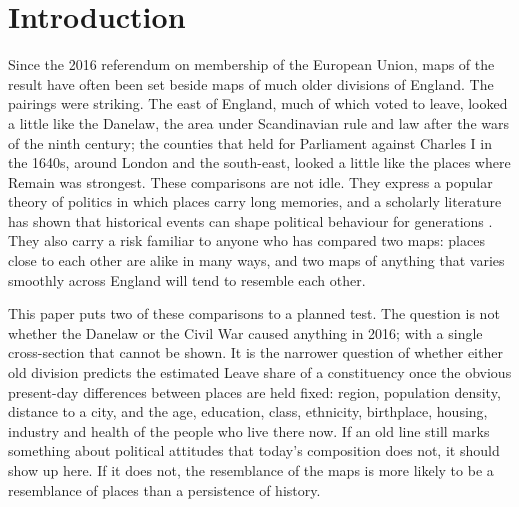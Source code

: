 \documentclass[11pt,a4paper]{article}
\begin{document}
\section{Introduction}\label{sec:intro}
Since the 2016 referendum on membership of the European Union, maps of the result have often been set beside maps of much older divisions of England. The pairings were striking. The east of England, much of which voted to leave, looked a little like the Danelaw, the area under Scandinavian rule and law after the wars of the ninth century; the counties that held for Parliament against Charles I in the 1640s, around London and the south-east, looked a little like the places where Remain was strongest. These comparisons are not idle. They express a popular theory of politics in which places carry long memories, and a scholarly literature has shown that historical events can shape political behaviour for generations \citep{satyanath2017,rodden2019}. They also carry a risk familiar to anyone who has compared two maps: places close to each other are alike in many ways, and two maps of anything that varies smoothly across England will tend to resemble each other.

This paper puts two of these comparisons to a planned test. The question is not whether the Danelaw or the Civil War caused anything in 2016; with a single cross-section that cannot be shown. It is the narrower question of whether either old division predicts the estimated Leave share of a constituency once the obvious present-day differences between places are held fixed: region, population density, distance to a city, and the age, education, class, ethnicity, birthplace, housing, industry and health of the people who live there now. If an old line still marks something about political attitudes that today's composition does not, it should show up here. If it does not, the resemblance of the maps is more likely to be a resemblance of places than a persistence of history.
\end{document}
